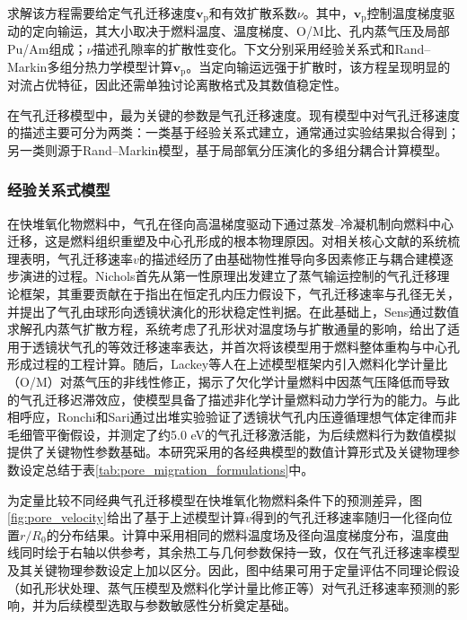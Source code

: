 求解该方程需要给定气孔迁移速度$\mathbf v_{\mathrm p}$和有效扩散系数$\nu$。其中，$\mathbf v_{\mathrm p}$控制温度梯度驱动的定向输运，其大小取决于燃料温度、温度梯度、O/M比、孔内蒸气压及局部Pu/Am组成；$\nu$描述孔隙率的扩散性变化。下文分别采用经验关系式和Rand--Markin多组分热力学模型计算$\mathbf v_{\mathrm p}$。当定向输运远强于扩散时，该方程呈现明显的对流占优特征，因此还需单独讨论离散格式及其数值稳定性。

在气孔迁移模型中，最为关键的参数是气孔迁移速度。现有模型中对气孔迁移速度的描述主要可分为两类：一类基于经验关系式建立，通常通过实验结果拟合得到\cite{ronchiPropertiesLenticularPores1974,sensKineticsPoreMovement1972,nicholsTheoryColumnarGrain1967}；另一类则源于Rand--Markin模型\cite{olanderFundamentalAspectsNuclear1976}，基于局部氧分压演化的多组分耦合计算模型\cite{ikusawaDevelopmentVerificationThermal2014}。

\subsubsection{经验关系式模型}
在快堆氧化物燃料中，气孔在径向高温梯度驱动下通过蒸发--冷凝机制向燃料中心迁移，这是燃料组织重塑及中心孔形成的根本物理原因。对相关核心文献的系统梳理表明，气孔迁移速率$v$的描述经历了由基础物性推导向多因素修正与耦合建模逐步演进的过程。Nichols\cite{nicholsTheoryColumnarGrain1967,nicholsDiffusionalMobilitiesParticles1972}首先从第一性原理出发建立了蒸气输运控制的气孔迁移理论框架，其重要贡献在于指出在恒定孔内压力假设下，气孔迁移速率与孔径无关，并提出了气孔由球形向透镜状演化的形状稳定性判据。在此基础上，Sens\cite{sensKineticsPoreMovement1972}通过数值求解孔内蒸气扩散方程，系统考虑了孔形状对温度场与扩散通量的影响，给出了适用于透镜状气孔的等效迁移速率表达，并首次将该模型用于燃料整体重构与中心孔形成过程的工程计算。随后，Lackey等人\cite{lackeyPorosityActinideRedistribution1972}在上述模型框架内引入燃料化学计量比（O/M）对蒸气压的非线性修正，揭示了欠化学计量燃料中因蒸气压降低而导致的气孔迁移迟滞效应，使模型具备了描述非化学计量燃料动力学行为的能力。与此相呼应，Ronchi和Sari\cite{ronchiPropertiesLenticularPores1974}通过出堆实验验证了透镜状气孔内压遵循理想气体定律而非毛细管平衡假设，并测定了约5.0 eV的气孔迁移激活能，为后续燃料行为数值模拟提供了关键物性参数基础。本研究采用的各经典模型的数值计算形式及关键物理参数设定总结于表\ref{tab:pore_migration_formulations}中。

为定量比较不同经典气孔迁移模型在快堆氧化物燃料条件下的预测差异，图\ref{fig:pore_velocity}给出了基于上述模型计算$v$得到的气孔迁移速率随归一化径向位置$r/R_0$的分布结果。计算中采用相同的燃料温度场及径向温度梯度分布，温度曲线同时绘于右轴以供参考，其余热工与几何参数保持一致，仅在气孔迁移速率模型及其关键物理参数设定上加以区分。因此，图中结果可用于定量评估不同理论假设（如孔形状处理、蒸气压模型及燃料化学计量比修正等）对气孔迁移速率预测的影响，并为后续模型选取与参数敏感性分析奠定基础。

